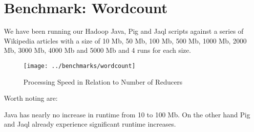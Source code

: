 \section{Benchmark: Wordcount}            

We have been running our Hadoop Java, Pig and Jaql scripts against a series of Wikipedia articles with a size of 10 Mb, 50 Mb, 100 Mb, 500 Mb, 1000 Mb, 2000 Mb, 3000 Mb, 4000 Mb and 5000 Mb and 4 runs for each size.

\begin{figure}[tb]
  \begin{center}
    \texttt{[image: ../benchmarks/wordcount]}
  \end{center}
  \caption{Processing Speed in Relation to Number of Reducers}
  \label{fig:reducers}
\end{figure}

Worth noting are:

Java has nearly no increase in runtime from 10 to 100 Mb. On the other hand Pig and Jaql already experience significant runtime increases.